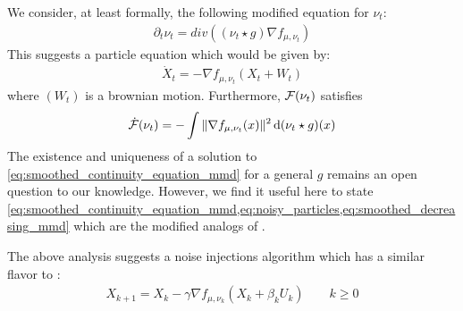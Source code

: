 We consider, at least formally, the following modified equation for $\nu_t$:
\begin{align}\label{eq:smoothed_continuity_equation_mmd}
	\partial_t \nu_t = div((\nu_t \star g) \nabla f_{\mu,\nu_t} )
\end{align}
This suggests a particle equation which would be given by:
\begin{align}\label{eq:noisy_particles}
	\dot{X}_t = -\nabla f_{\mu,\nu_t}( X_t + W_t  )
\end{align}
where $(W_t)$ is a brownian motion. Furthermore, ${{\mathcal F}}(\nu_t)$ satisfies
\begin{align}\label{eq:smoothed_decreasing_mmd}
	\dot{{{\mathcal F}}}(\nu_t) = -\int \Vert \nabla f_{\mu,\nu_t}(x)\Vert^2 \mathop{}\!\mathrm{d} (\nu_t\star g)(x)
\end{align}
The existence and uniqueness of a solution to \cref{eq:smoothed_continuity_equation_mmd} for a general $g$ remains an open question to our knowledge. However, we find it useful here to state \cref{eq:smoothed_continuity_equation_mmd,eq:noisy_particles,eq:smoothed_decreasing_mmd} which are the modified analogs of .

The above analysis suggests a noise injections algorithm which has a similar flavor to :
\begin{align}\label{eq:discretized_noisy_flow}
	X_{k+1} = X_{k} -\gamma \nabla f_{\mu,\nu_k}(X_k+ \beta_k U_k) \qquad k\geq 0
\end{align}

